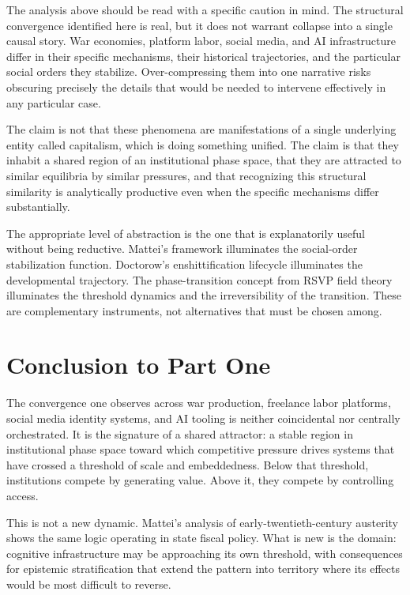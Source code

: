 \documentclass[12pt, a4paper]{article}
\begin{document}
The analysis above should be read with a specific caution in mind. The
structural convergence identified here is real, but it does not warrant
collapse into a single causal story. War economies, platform labor, social
media, and AI infrastructure differ in their specific mechanisms, their
historical trajectories, and the particular social orders they stabilize.
Over-compressing them into one narrative risks obscuring precisely the
details that would be needed to intervene effectively in any particular
case.

The claim is not that these phenomena are manifestations of a single
underlying entity called capitalism, which is doing something unified. The
claim is that they inhabit a shared region of an institutional phase space,
that they are attracted to similar equilibria by similar pressures, and that
recognizing this structural similarity is analytically productive even when
the specific mechanisms differ substantially.

The appropriate level of abstraction is the one that is explanatorily useful
without being reductive. Mattei's framework illuminates the social-order
stabilization function. Doctorow's enshittification lifecycle illuminates
the developmental trajectory. The phase-transition concept from RSVP field
theory illuminates the threshold dynamics and the irreversibility of the
transition. These are complementary instruments, not alternatives that must
be chosen among.

\section{Conclusion to Part One}

The convergence one observes across war production, freelance labor platforms,
social media identity systems, and AI tooling is neither coincidental nor
centrally orchestrated. It is the signature of a shared attractor: a stable
region in institutional phase space toward which competitive pressure drives
systems that have crossed a threshold of scale and embeddedness. Below that
threshold, institutions compete by generating value. Above it, they compete
by controlling access.

This is not a new dynamic. Mattei's analysis of early-twentieth-century
austerity shows the same logic operating in state fiscal policy. What is new
is the domain: cognitive infrastructure may be approaching its own threshold,
with consequences for epistemic stratification that extend the pattern into
territory where its effects would be most difficult to reverse.
\end{document}
